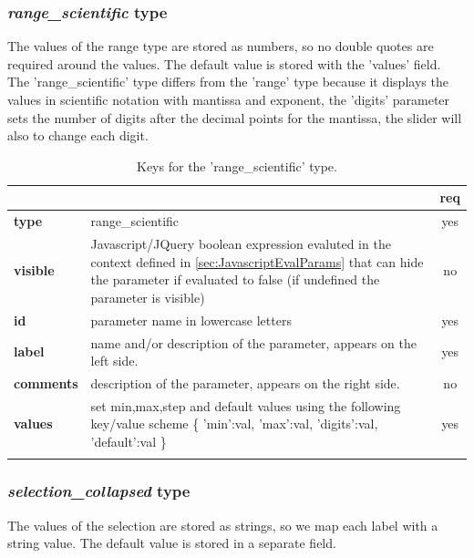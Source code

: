 \subsubsection{ \emph{range\_scientific} type}

The values of the range type are stored as numbers, so no double quotes are 
required around the values. The default value is stored with the 'values' field.
The 'range\_scientific' type differs from the 'range' type because it displays
the values in scientific notation with mantissa and exponent, the 'digits' parameter
sets the number of digits after the decimal points for the mantissa, the slider
will also to change each digit.

\begin{longtable}{|>{\bf}L{\linewidth}|L{\linewidth}|c|}
\hline
      &  & {\bf req} 
\tabularnewline \hline \hline
 type  & range\_scientific       & yes \\ \hline
 visible  & Javascript/JQuery boolean expression evaluted in the context defined 
              in \ref{sec:JavascriptEvalParams} that can hide the parameter if
            evaluated to false (if undefined the parameter is visible)& no \\ \hline
 id     & parameter name in lowercase letters  & yes \\ \hline
 label  & name and/or description of the parameter, appears on the left side. & yes
                      \\ \hline
 comments & description of the parameter, appears on the right side. & no
                      \\ \hline
 values & set min,max,step and default values using the following key/value 
scheme \{ 'min':val, 'max':val, 'digits':val, 'default':val \} & yes
                      \\ \hline
\caption{Keys for the 'range\_scientific' type.}
\end{longtable}


\subsubsection{ \emph{selection\_collapsed} type}

The values of the selection are stored as strings, so we map each label with a 
string value. The default value is stored in a separate field.


